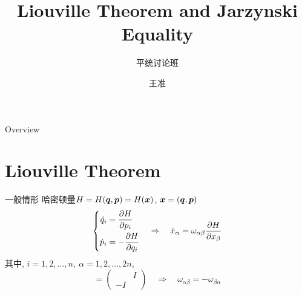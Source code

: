 \documentclass[aspectratio=169]{wzbeamer}
\title{Liouville Theorem and Jarzynski Equality}
\subtitle{平统讨论班}
\author{王准}
\institute[pku]{北京大学}
\begin{document}
\maketitle 
    
\begin{frame}{Overview}
    \tableofcontents
\end{frame}

\section{Liouville Theorem}
    \begin{frame}{一般情形}
        哈密顿量$H = H(\vb*q, \vb*p) = H(\vb*x)$, $\vb*x = (\vb*q, \vb*p)$
        \begin{equation}
            \left\{
            \begin{split}
                \dot{q}_i &= \pdv{H}{p_i}\\
                \dot{p}_i &= - \pdv{H}{q_i}
            \end{split}
            \right.\quad
            \Rightarrow\quad
            \dot{x}_\alpha = \omega_{\alpha\beta} \pdv{H}{x_\beta}
        \end{equation}
        其中, $i = 1,2,\dots,n, \ \alpha = 1,2,\dots,2n$, 
        \begin{equation}
            [\omega_{\alpha\beta}] = 
            \begin{pmatrix}
                & I \\
                -I & 
            \end{pmatrix}
            \quad\Rightarrow\quad
            \omega_{\alpha\beta} = -\omega_{\beta\alpha}
        \end{equation}
    \end{frame}



\end{document}
